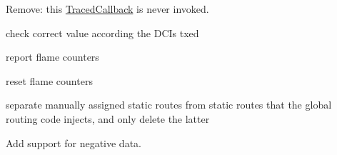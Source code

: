 \begin{DoxyRefList}
\item[\label{todo__todo000032}%
\hypertarget{todo__todo000032}{}%
Member \hyperlink{classns3_1_1FdNetDevice_acd0f33f8fede665976f2485300c20810}{ns3\+:\+:Fd\+Net\+Device\+:\+:m\+\_\+phy\+Tx\+Drop\+Trace} ]Remove\+: this \hyperlink{classns3_1_1TracedCallback}{Traced\+Callback} is never invoked. 
\item[\label{todo__todo000080}%
\hypertarget{todo__todo000080}{}%
Member \hyperlink{classns3_1_1FdTbfqFfMacScheduler_aca7deb47b0377b1facea6c6378ba2ec7}{ns3\+:\+:Fd\+Tbfq\+Ff\+Mac\+Scheduler\+:\+:Do\+Sched\+Dl\+Trigger\+Req} (const struct \hyperlink{structns3_1_1FfMacSchedSapProvider_1_1SchedDlTriggerReqParameters}{Ff\+Mac\+Sched\+Sap\+Provider\+::\+Sched\+Dl\+Trigger\+Req\+Parameters} \&params)]check correct value according the D\+C\+Is txed  
\item[\label{todo__todo000113}%
\hypertarget{todo__todo000113}{}%
Member \hyperlink{classns3_1_1FlameStack_a6f7ad90d875c88d10437670b28d9f8e0}{ns3\+:\+:Flame\+Stack\+:\+:Report} (const Ptr$<$ Mesh\+Point\+Device $>$ mp, std\+::ostream \&)]report flame counters  
\item[\label{todo__todo000114}%
\hypertarget{todo__todo000114}{}%
Member \hyperlink{classns3_1_1FlameStack_a101c1ea5691abd5942270441df461a2d}{ns3\+:\+:Flame\+Stack\+:\+:Reset\+Stats} (const Ptr$<$ Mesh\+Point\+Device $>$ mp)]reset flame counters  
\item[\label{todo__todo000036}%
\hypertarget{todo__todo000036}{}%
Member \hyperlink{classns3_1_1GlobalRouteManagerImpl_a74aa2a4b5dc2015b6424cb307fcc2d1a}{ns3\+:\+:Global\+Route\+Manager\+Impl\+:\+:Delete\+Global\+Routes} ()]separate manually assigned static routes from static routes that the global routing code injects, and only delete the latter  
\item[\label{todo__todo000033}%
\hypertarget{todo__todo000033}{}%
Class \hyperlink{classns3_1_1Histogram}{ns3\+:\+:Histogram} ]Add support for negative data.


\end{DoxyRefList}
